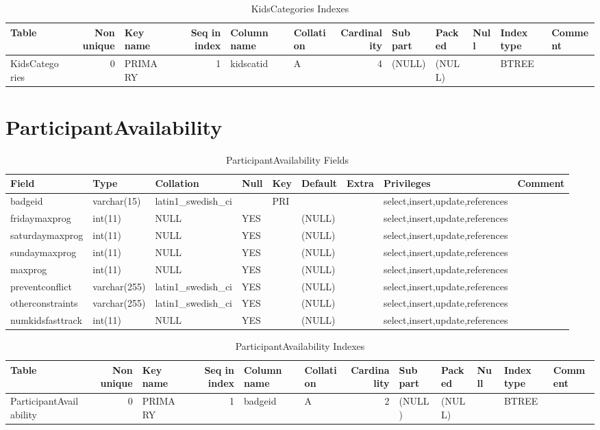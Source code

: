 \documentclass[captions=tablesignature]{scrartcl}
\begin{document}
\begin{table}[htb]
\caption{\label{tbl:kidscategoriesindexes}KidsCategories Indexes}
\centering
\begin{tabular}{lrlrllrlllll}
\hline
Table & Non unique & Key name & Seq in index & Column name & Collation & Cardinality & Sub part & Packed & Null & Index type & Comment\\
\hline
KidsCategories & 0 & PRIMARY & 1 & kidscatid & A & 4 & (NULL) & (NULL) &  & BTREE & \\
\hline
\end{tabular}
\end{table}
\section{ParticipantAvailability}
\label{sec-5}

\begin{table}[htb]
\caption{\label{tbl:participantavailabilityfields}ParticipantAvailability Fields}
\centering
\begin{tabular}{lllllllll}
\hline
Field & Type & Collation & Null & Key & Default & Extra & Privileges & Comment\\
\hline
badgeid & varchar(15) & latin1\_swedish\_ci &  & PRI &  &  & select,insert,update,references & \\
fridaymaxprog & int(11) & NULL & YES &  & (NULL) &  & select,insert,update,references & \\
saturdaymaxprog & int(11) & NULL & YES &  & (NULL) &  & select,insert,update,references & \\
sundaymaxprog & int(11) & NULL & YES &  & (NULL) &  & select,insert,update,references & \\
maxprog & int(11) & NULL & YES &  & (NULL) &  & select,insert,update,references & \\
preventconflict & varchar(255) & latin1\_swedish\_ci & YES &  & (NULL) &  & select,insert,update,references & \\
otherconstraints & varchar(255) & latin1\_swedish\_ci & YES &  & (NULL) &  & select,insert,update,references & \\
numkidsfasttrack & int(11) & NULL & YES &  & (NULL) &  & select,insert,update,references & \\
\hline
\end{tabular}
\end{table}

\begin{table}[htb]
\caption{\label{tbl:participantavailabilityindexes}ParticipantAvailability Indexes}
\centering
\begin{tabular}{lrlrllrlllll}
\hline
Table & Non unique & Key name & Seq in index & Column name & Collation & Cardinality & Sub part & Packed & Null & Index type & Comment\\
\hline
ParticipantAvailability & 0 & PRIMARY & 1 & badgeid & A & 2 & (NULL) & (NULL) &  & BTREE & \\
\hline
\end{tabular}
\end{table}
\end{document}
